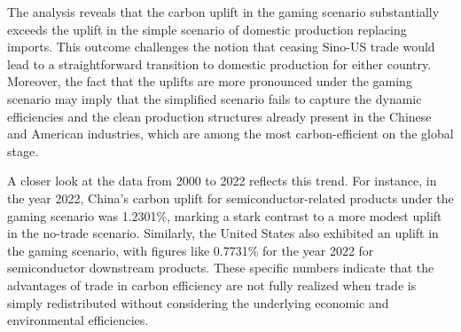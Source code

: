  The analysis reveals that the carbon uplift in the gaming scenario substantially exceeds the uplift in the simple scenario of domestic production replacing imports. This outcome challenges the notion that ceasing Sino-US trade would lead to a straightforward transition to domestic production for either country. Moreover, the fact that the uplifts are more pronounced under the gaming scenario may imply that the simplified scenario fails to capture the dynamic efficiencies and the clean production structures already present in the Chinese and American industries, which are among the most carbon-efficient on the global stage.
 
 A closer look at the data from 2000 to 2022 reflects this trend. For instance, in the year 2022, China's carbon uplift for semiconductor-related products under the gaming scenario was 1.2301\%, marking a stark contrast to a more modest uplift in the no-trade scenario. Similarly, the United States also exhibited an uplift in the gaming scenario, with figures like 0.7731\% for the year 2022 for semiconductor downstream products. These specific numbers indicate that the advantages of trade in carbon efficiency are not fully realized when trade is simply redistributed without considering the underlying economic and environmental efficiencies.
 

